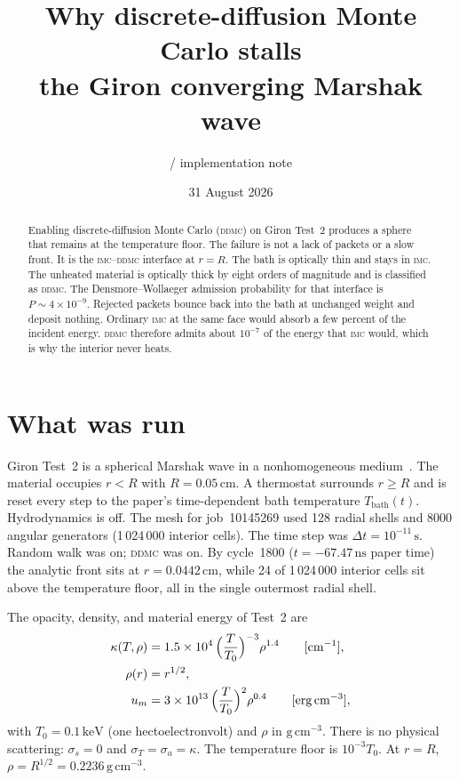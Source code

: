 \documentclass[11pt]{article}
\title{Why discrete-diffusion Monte Carlo stalls\\
the Giron converging Marshak wave}
\author{\rich{} / \storm{} implementation note}
\date{31 August 2026}
\newcommand{\imc}{\textsc{imc}}
\newcommand{\ddmc}{\textsc{ddmc}}
\begin{document}
\maketitle

\begin{abstract}
Enabling discrete-diffusion Monte Carlo (\ddmc) on Giron Test~2 produces a sphere that remains at the temperature floor.
The failure is not a lack of packets or a slow front.
It is the \imc--\ddmc{} interface at $r=R$.
The bath is optically thin and stays in \imc{}.
The unheated material is optically thick by eight orders of magnitude and is classified as \ddmc{}.
The Densmore--Wollaeger admission probability for that interface is $P\sim 4\times 10^{-9}$.
Rejected packets bounce back into the bath at unchanged weight and deposit nothing.
Ordinary \imc{} at the same face would absorb a few percent of the incident energy.
\ddmc{} therefore admits about $10^{-7}$ of the energy that \imc{} would, which is why the interior never heats.
\end{abstract}

\section{What was run}

Giron Test~2 is a spherical Marshak wave in a nonhomogeneous medium~\cite{giron}.
The material occupies $r<R$ with $R=0.05\,\mathrm{cm}$.
A thermostat surrounds $r\ge R$ and is reset every step to the paper's time-dependent bath temperature $T_{\mathrm{bath}}(t)$.
Hydrodynamics is off.
The mesh for job~10145269 used 128 radial shells and 8000 angular generators (1\,024\,000 interior cells).
The time step was $\Delta t=10^{-11}\,\mathrm{s}$.
Random walk was on; \ddmc{} was on.
By cycle~1800 ($t=-67.47\,\mathrm{ns}$ paper time) the analytic front sits at $r=0.0442\,\mathrm{cm}$, while 24 of 1\,024\,000 interior cells sit above the temperature floor, all in the single outermost radial shell.

The opacity, density, and material energy of Test~2 are
\begin{align}
  \kappa(T,\rho)
  &= 1.5\times 10^{4}\,
     \Bigl(\frac{T}{T_0}\Bigr)^{-3}
     \rho^{1.4}
     \qquad[\mathrm{cm}^{-1}],
  \label{eq:opacity}\\
  \rho(r)
  &= r^{1/2},
  \label{eq:density}\\
  u_m
  &= 3\times 10^{13}\,
     \Bigl(\frac{T}{T_0}\Bigr)^{2}
     \rho^{0.4}
     \qquad[\mathrm{erg}\,\mathrm{cm}^{-3}],
  \label{eq:eos}
\end{align}
with $T_0=0.1\,\mathrm{keV}$ (one hectoelectronvolt) and $\rho$ in $\mathrm{g}\,\mathrm{cm}^{-3}$.
There is no physical scattering: $\sigma_s=0$ and $\sigma_T=\sigma_a=\kappa$.
The temperature floor is $10^{-3}T_0$.
At $r=R$, $\rho=R^{1/2}=0.2236\,\mathrm{g}\,\mathrm{cm}^{-3}$.
\end{document}
